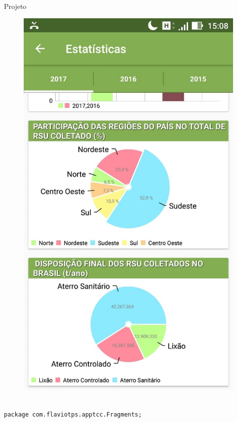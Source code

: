 \documentclass[
	12pt,				%
	openright,			%
	twoside,			%
	a4paper,			%
	english,			%
	french,				%
	spanish,			%
	brazil				%
	]{abntex2}
\begin{document}
\begin{chapter}{Projeto}
\begin{figure}[htb]
\begin{minipage}{0.45\textwidth}
    \includegraphics[scale=0.35]{media/tela_stats_2.jpg}
     \label{fig:tela_stats_2}
  \end{minipage}
\end{figure}


\begin{lstlisting}[numbers=none,basicstyle=\small,
caption={FragmentStatistics.java},
title={FragmentStatistics.java},
label={FragmentStatistics.java}]

package com.flaviotps.apptcc.Fragments;


\end{lstlisting}
\end{chapter}
\end{document}
